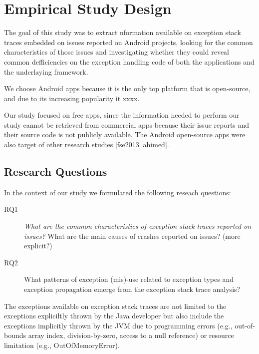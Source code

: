 \documentclass[conference]{IEEEtran}
\begin{document}
\section{Empirical Study Design}

The goal of this study was to extract nformation available on exception stack 
traces embedded on issues reported on Android projects, looking for the common characteristics of
those issues and investigating whether they could reveal common defficiencies
on the exception handling code of both the applications and the underlaying 
 framework. 

We choose Android apps because it is the only top platform that is open-source,
and due to its increasing popularity it xxxx.

Our study focused on free apps, since the information needed to perform our study
cannot be retrieved from commercial apps because their issue reports and their
source code is not publicly available. The Android open-source apps were also 
target of other research studies [fse2013][ahimed].   


\subsection{Research Questions}
In the context of our study we formulated the following reseach questions:

\begin{description}

  \item[RQ1] \noindent\emph{What are the common characteristics of exception stack traces reported on issues?} What are the main causes of crashes reported on issues? (more explicit?)

  \item[RQ2] What patterns of exception (mis)-use related to exception types and exception propagation emerge from the exception stack trace analysis?

\end{description}




 
The exceptions available on exception stack traces are not limited to the exceptions 
expliciltly thrown by the Java developer but also include
the exceptions implicitly thrown by the JVM due to programming errors (e.g., out-of-bounds array index, division-by-zero, 
access to a null reference) or resource limitation (e.g., OutOfMemoryError).
\end{document}
